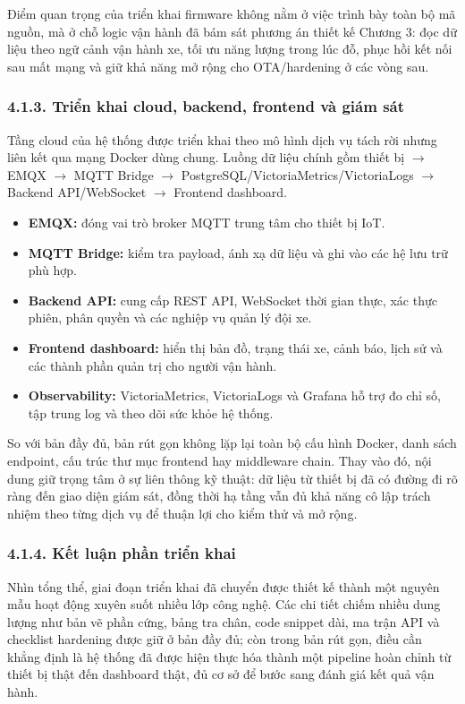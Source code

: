 \documentclass[a4paper]{extarticle}
\providecommand{\tightlist}{%
  \setlength{\itemsep}{0pt}\setlength{\parskip}{0pt}}
\begin{document}
Điểm quan trọng của triển khai firmware không nằm ở việc trình bày toàn bộ mã nguồn, mà ở chỗ logic vận hành đã bám sát phương án thiết kế Chương 3: đọc dữ liệu theo ngữ cảnh vận hành xe, tối ưu năng lượng trong lúc đỗ, phục hồi kết nối sau mất mạng và giữ khả năng mở rộng cho OTA/hardening ở các vòng sau.

\subsubsection{4.1.3. Triển khai cloud, backend, frontend và giám sát}

Tầng cloud của hệ thống được triển khai theo mô hình dịch vụ tách rời nhưng liên kết qua mạng Docker dùng chung. Luồng dữ liệu chính gồm thiết bị \(\rightarrow\) EMQX \(\rightarrow\) MQTT Bridge \(\rightarrow\) PostgreSQL/VictoriaMetrics/VictoriaLogs \(\rightarrow\) Backend API/WebSocket \(\rightarrow\) Frontend dashboard.

\begin{itemize}
\tightlist
\item
  \textbf{EMQX:} đóng vai trò broker MQTT trung tâm cho thiết bị IoT.
\item
  \textbf{MQTT Bridge:} kiểm tra payload, ánh xạ dữ liệu và ghi vào các hệ lưu trữ phù hợp.
\item
  \textbf{Backend API:} cung cấp REST API, WebSocket thời gian thực, xác thực phiên, phân quyền và các nghiệp vụ quản lý đội xe.
\item
  \textbf{Frontend dashboard:} hiển thị bản đồ, trạng thái xe, cảnh báo, lịch sử và các thành phần quản trị cho người vận hành.
\item
  \textbf{Observability:} VictoriaMetrics, VictoriaLogs và Grafana hỗ trợ đo chỉ số, tập trung log và theo dõi sức khỏe hệ thống.
\end{itemize}

So với bản đầy đủ, bản rút gọn không lặp lại toàn bộ cấu hình Docker, danh sách endpoint, cấu trúc thư mục frontend hay middleware chain. Thay vào đó, nội dung giữ trọng tâm ở sự liên thông kỹ thuật: dữ liệu từ thiết bị đã có đường đi rõ ràng đến giao diện giám sát, đồng thời hạ tầng vẫn đủ khả năng cô lập trách nhiệm theo từng dịch vụ để thuận lợi cho kiểm thử và mở rộng.

\subsubsection{4.1.4. Kết luận phần triển khai}

Nhìn tổng thể, giai đoạn triển khai đã chuyển được thiết kế thành một nguyên mẫu hoạt động xuyên suốt nhiều lớp công nghệ. Các chi tiết chiếm nhiều dung lượng như bản vẽ phần cứng, bảng tra chân, code snippet dài, ma trận API và checklist hardening được giữ ở bản đầy đủ; còn trong bản rút gọn, điều cần khẳng định là hệ thống đã được hiện thực hóa thành một pipeline hoàn chỉnh từ thiết bị thật đến dashboard thật, đủ cơ sở để bước sang đánh giá kết quả vận hành.
\end{document}
